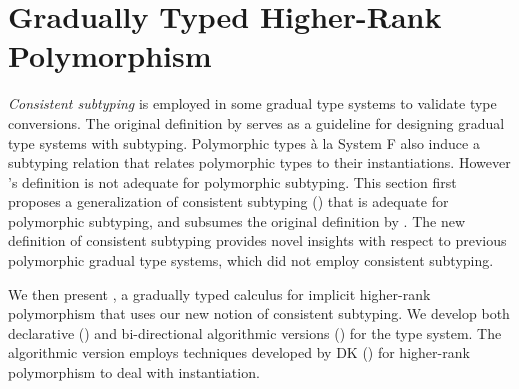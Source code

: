 \chapter{Gradually Typed Higher-Rank Polymorphism}
\label{chap:Gradual}

\textit{Consistent subtyping} is employed in some gradual type systems to validate type
conversions. The original definition by \citet{siek2007gradual} serves as
a guideline for designing gradual type systems with subtyping. Polymorphic
types \`a la System F also induce a subtyping relation that relates
polymorphic types to their instantiations. However
\citeauthor{siek2007gradual}'s definition is not adequate for polymorphic
subtyping.
This section first proposes a generalization of consistent subtyping
() that is adequate for polymorphic subtyping, and
subsumes the original definition by \citeauthor{siek2007gradual}. The new
definition of consistent subtyping provides novel insights with respect to
previous polymorphic gradual type systems, which did not employ consistent
subtyping.

We then present \gpc, a gradually typed calculus for implicit
higher-rank polymorphism that uses our new notion of consistent subtyping. We
develop both declarative () and bi-directional
algorithmic versions () for the type system. The
algorithmic version employs techniques developed by DK () for
higher-rank polymorphism to deal with instantiation.








